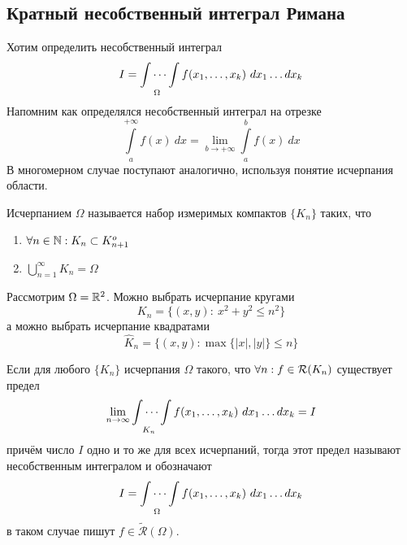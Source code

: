 \subsection{Кратный несобственный интеграл Римана}
Хотим определить несобственный интеграл
\[I=\idotsint\limits_{\Omega}f(x_1,\dots,x_k)\ dx_1\dots dx_k\]
Напомним как определялся несобственный интеграл на отрезке
\[\int\limits_{a}^{+\infty} f(x)\ dx=\lim\limits_{b\to +\infty}\int\limits_{a}^{b}f(x)\ dx\]
В многомерном случае поступают аналогично, используя понятие исчерпания области.
\begin{definition}
    Исчерпанием $\Omega$ называется набор измеримых компактов $\{K_n\}$ таких, что 
    \begin{enumerate}
        \item $\forall n\in \mathbb{N}: K_n\subset K^o_{n+1}$
        \item $\bigcup\limits_{n=1}^{\infty}K_n=\Omega$
    \end{enumerate}
\end{definition}
\begin{example}
    Рассмотрим $\Omega=\mathbb{R}^2$. Можно выбрать исчерпание кругами
    \[K_n=\{(x,y):\ x^2+y^2\leq n^2\}\] 
    а можно выбрать исчерпание квадратами
    \[\widehat{K}_n=\{(x,y): \max\{|x|, |y|\}\leq n\}\]
\end{example}
\begin{definition}
    Если для любого $\{K_n\}$ исчерпания $\Omega$ такого, что $\forall n:\\
    f\in \mathcal{R}(K_n)$ существует предел
    \[\lim\limits_{n\to \infty}\idotsint\limits_{K_n}f(x_1,\dots,x_k)\ dx_1\dots dx_k=I\]
    причём число $I$ одно и то же для всех исчерпаний, тогда этот предел называют несобственным интегралом и обозначают
    \[I=\idotsint\limits_{\Omega}f(x_1,\dots,x_k)\ dx_1\dots dx_k\]
    в таком случае пишут $f\in \widetilde{\mathcal{R}}(\Omega)$.
\end{definition}
\newpage